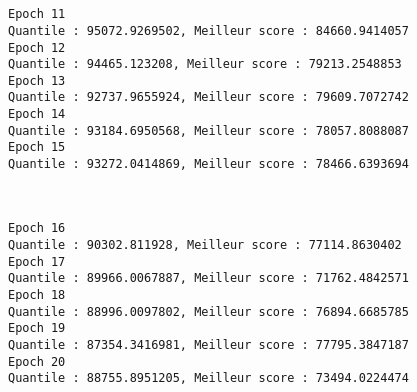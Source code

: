 \documentclass[11pt]{article}
\begin{document}
    \begin{center}
    \end{center}
    { \hspace*{\fill} \\}
    
    \begin{center}
    \end{center}
    { \hspace*{\fill} \\}
    
    \begin{Verbatim}[commandchars=\\\{\}]
Epoch 11
Quantile : 95072.9269502, Meilleur score : 84660.9414057
Epoch 12
Quantile : 94465.123208, Meilleur score : 79213.2548853
Epoch 13
Quantile : 92737.9655924, Meilleur score : 79609.7072742
Epoch 14
Quantile : 93184.6950568, Meilleur score : 78057.8088087
Epoch 15
Quantile : 93272.0414869, Meilleur score : 78466.6393694

    \end{Verbatim}

    \begin{center}
    \end{center}
    { \hspace*{\fill} \\}
    
    \begin{Verbatim}[commandchars=\\\{\}]
Epoch 16
Quantile : 90302.811928, Meilleur score : 77114.8630402
Epoch 17
Quantile : 89966.0067887, Meilleur score : 71762.4842571
Epoch 18
Quantile : 88996.0097802, Meilleur score : 76894.6685785
Epoch 19
Quantile : 87354.3416981, Meilleur score : 77795.3847187
Epoch 20
Quantile : 88755.8951205, Meilleur score : 73494.0224474

    \end{Verbatim}

    \begin{center}
    \end{center}
    { \hspace*{\fill} \\}
    
    \begin{center}
    \end{center}
    { \hspace*{\fill} \\}
    
\end{document}
